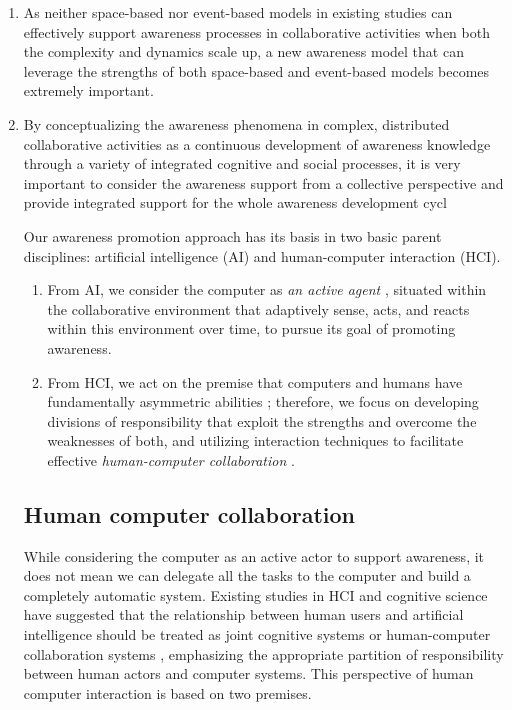 \begin{enumerate}
   \item As neither space-based nor event-based models in existing studies can effectively support awareness processes in collaborative activities when both the complexity and dynamics scale up, a new awareness model that can leverage the strengths of both space-based and event-based models becomes extremely important.
   \item By conceptualizing the awareness phenomena in complex, distributed collaborative activities as a continuous development of awareness knowledge through a variety of integrated cognitive and social processes, it is very important to consider the awareness support from a collective perspective and provide integrated support for the whole awareness development cycl


Our awareness promotion approach has its basis in two basic parent disciplines:  artificial intelligence (AI) and human-computer interaction (HCI). 
\begin{enumerate}
   \item From AI, we consider the computer as \emph{an active agent} \cite{Brown99activeuser}, situated within the collaborative environment that adaptively sense, acts, and reacts within this environment over time, to pursue its goal of promoting awareness.
   \item From HCI, we act on the premise that computers and humans have fundamentally asymmetric abilities \cite{Dalal1994}; therefore, we focus on developing divisions of responsibility that exploit the strengths and overcome the weaknesses of both, and utilizing interaction techniques to facilitate effective \emph{human-computer collaboration} \cite{Terveen1995}.
\end{enumerate}


\subsection{Human computer collaboration} %
\label{sub:human_computer_collaboration}
While considering the computer as an active actor to support awareness, it does not mean we can delegate all the tasks to the computer and build a completely automatic system. Existing studies in HCI and cognitive science have suggested that the relationship between human users and artificial intelligence should be treated as joint cognitive systems \cite{Dalal1994} or human-computer collaboration systems \cite{Terveen1995}, emphasizing the appropriate partition of responsibility between human actors and computer systems. This perspective of human computer interaction is based on two premises.


\end{enumerate}
